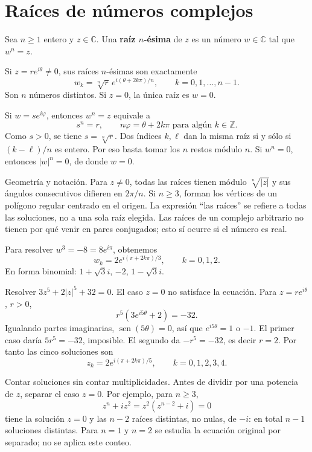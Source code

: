 \section{Raíces de números complejos}
\begin{definicion}
Sea $n\geq1$ entero y $z\in\mathbb C$. Una \textbf{raíz $n$-ésima}
de $z$ es un número $w\in\mathbb C$ tal que $w^n=z$.
\end{definicion}
\begin{proposicion}[{title={Todas las raíces $n$-ésimas}}]
Si $z=re^{i\theta}\neq0$, sus raíces $n$-ésimas son exactamente
\[
w_k=\sqrt[n]{r}\,e^{i(\theta+2k\pi)/n},\qquad k=0,1,\ldots,n-1.
\]
Son $n$ números distintos. Si $z=0$, la única raíz es $w=0$.
\end{proposicion}
\begin{demostracion}
Si $w=se^{i\varphi}$, entonces $w^n=z$ equivale a
\[
s^n=r,\qquad n\varphi=\theta+2k\pi\text{ para algún }k\in\mathbb Z.
\]
Como $s>0$, se tiene $s=\sqrt[n]r$. Dos índices $k,\ell$ dan la
misma raíz si y sólo si $(k-\ell)/n$ es entero. Por eso basta tomar
los $n$ restos módulo $n$.
Si $w^n=0$, entonces $|w|^n=0$, de donde $w=0$.
\end{demostracion}
\begin{nota}{Geometría y notación.}
Para $z\neq0$, todas las raíces tienen módulo $\sqrt[n]{|z|}$ y sus
ángulos consecutivos difieren en $2\pi/n$. Si $n\geq3$, forman los
vértices de un polígono regular centrado en el origen.
La expresión ``las raíces'' se refiere a todas las soluciones, no a
una sola raíz elegida. Las raíces de un complejo arbitrario no tienen
por qué venir en pares conjugados; esto sí ocurre si el número es real.
\end{nota}
\begin{ejemplo}
Para resolver $w^3=-8=8e^{i\pi}$, obtenemos
\[
w_k=2e^{i(\pi+2k\pi)/3},\qquad k=0,1,2.
\]
En forma binomial: $1+\sqrt3i$, $-2$, $1-\sqrt3i$.
\end{ejemplo}
\begin{ejemplo}
Resolver $3z^5+2|z|^5+32=0$. El caso $z=0$ no satisface la ecuación.
Para $z=re^{i\theta}$, $r>0$,
\[
r^5(3e^{i5\theta}+2)=-32.
\]
Igualando partes imaginarias, $\operatorname{sen}(5\theta)=0$,
así que $e^{i5\theta}=1$ o $-1$. El primer caso daría $5r^5=-32$,
imposible. El segundo da $-r^5=-32$, es decir $r=2$.
Por tanto las cinco soluciones son
\[
z_k=2e^{i(\pi+2k\pi)/5},\qquad k=0,1,2,3,4.
\]
\end{ejemplo}
\begin{nota}{Contar soluciones sin contar multiplicidades.}
Antes de dividir por una potencia de $z$, separar el caso $z=0$.
Por ejemplo, para $n\geq3$,
\[
z^n+iz^2=z^2(z^{n-2}+i)=0
\]
tiene la solución $z=0$ y las $n-2$ raíces distintas, no nulas, de $-i$:
en total $n-1$ soluciones distintas. Para $n=1$ y $n=2$ se estudia
la ecuación original por separado; no se aplica este conteo.
\end{nota}

